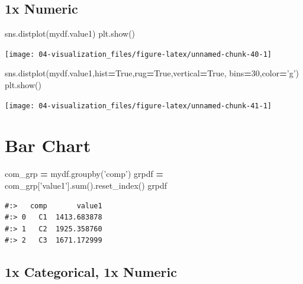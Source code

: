 \documentclass[
]{book}
\newenvironment{Shaded}{\begin{snugshade}}{\end{snugshade}}
\newcommand{\BuiltInTok}[1]{#1}
\newcommand{\DecValTok}[1]{\textcolor[rgb]{0.06,0.06,0.06}{#1}}
\newcommand{\NormalTok}[1]{#1}
\newcommand{\OperatorTok}[1]{\textcolor[rgb]{0.43,0.43,0.43}{\textbf{#1}}}
\newcommand{\StringTok}[1]{\textcolor[rgb]{0.5,0.5,0.5}{#1}}
\newcommand{\VariableTok}[1]{\textcolor[rgb]{0,0,0}{#1}}
\begin{document}
\hypertarget{x-numeric-1}{%
\subsection{1x Numeric}\label{x-numeric-1}}

\begin{Shaded}
\begin{Highlighting}[]
\NormalTok{sns.distplot(mydf.value1)}
\NormalTok{plt.show()}
\end{Highlighting}
\end{Shaded}

\texttt{[image: 04-visualization\_files/figure-latex/unnamed-chunk-40-1]}

\begin{Shaded}
\begin{Highlighting}[]
\NormalTok{sns.distplot(mydf.value1,hist}\OperatorTok{=}\VariableTok{True}\NormalTok{,rug}\OperatorTok{=}\VariableTok{True}\NormalTok{,vertical}\OperatorTok{=}\VariableTok{True}\NormalTok{, bins}\OperatorTok{=}\DecValTok{30}\NormalTok{,color}\OperatorTok{=}\StringTok{'g'}\NormalTok{)}
\NormalTok{plt.show()}
\end{Highlighting}
\end{Shaded}

\texttt{[image: 04-visualization\_files/figure-latex/unnamed-chunk-41-1]}

\hypertarget{bar-chart-1}{%
\section{Bar Chart}\label{bar-chart-1}}

\begin{Shaded}
\begin{Highlighting}[]
\NormalTok{com_grp }\OperatorTok{=}\NormalTok{ mydf.groupby(}\StringTok{'comp'}\NormalTok{)}
\NormalTok{grpdf }\OperatorTok{=}\NormalTok{ com_grp[}\StringTok{'value1'}\NormalTok{].}\BuiltInTok{sum}\NormalTok{().reset_index()}
\NormalTok{grpdf}
\end{Highlighting}
\end{Shaded}

\begin{verbatim}
#:>   comp       value1
#:> 0   C1  1413.683878
#:> 1   C2  1925.358760
#:> 2   C3  1671.172999
\end{verbatim}

\hypertarget{x-categorical-1x-numeric}{%
\subsection{1x Categorical, 1x Numeric}\label{x-categorical-1x-numeric}}
\end{document}
